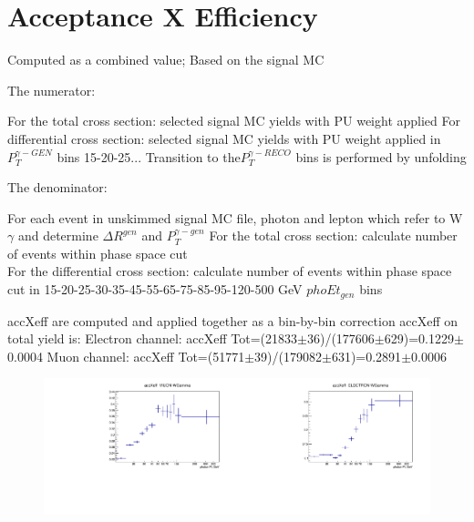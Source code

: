 \section{Acceptance X Efficiency}
\label{sec:AccXEff}

Computed as a combined value; Based on the signal MC

The numerator:

For the total cross section: selected signal MC yields with PU weight applied
For differential cross section: selected signal MC yields with PU weight applied in $P_T^{\gamma-GEN}$ bins 15-20-25... Transition to the$P_T^{\gamma-RECO}$ bins is performed by unfolding

The denominator:

For each event in unskimmed signal MC file, photon and lepton which refer to W$\gamma$ and determine $\Delta R^{gen}$ and $P_T^{\gamma-gen}$ 
For the total cross section: calculate number of events within phase space cut\\
For the differential cross section: calculate number of events within phase space cut in 15-20-25-30-35-45-55-65-75-85-95-120-500 GeV $phoEt_{gen}$ bins

accXeff are computed and applied together as a bin-by-bin correction
accXeff on total yield is:
Electron channel: accXeff Tot=(21833$\pm$36)/(177606$\pm$629)=0.1229$\pm$0.0004
Muon channel: accXeff Tot=(51771$\pm$39)/(179082$\pm$631)=0.2891$\pm$0.0006
\begin{figure}[htb]
  \begin{center}
  \includegraphics[width=0.5\textwidth]{../figs/figs_v11/MUON_WGamma/Constants/C_accXeff_MUON_WGamma.pdf}\includegraphics[width=0.5\textwidth]{../figs/figs_v11/ELECTRON_WGamma/Constants/C_accXeff_ELECTRON_WGamma.pdf}\\
  \label{fig:covMatricesaccXeff_Wg}
  \end{center}
\end{figure}

